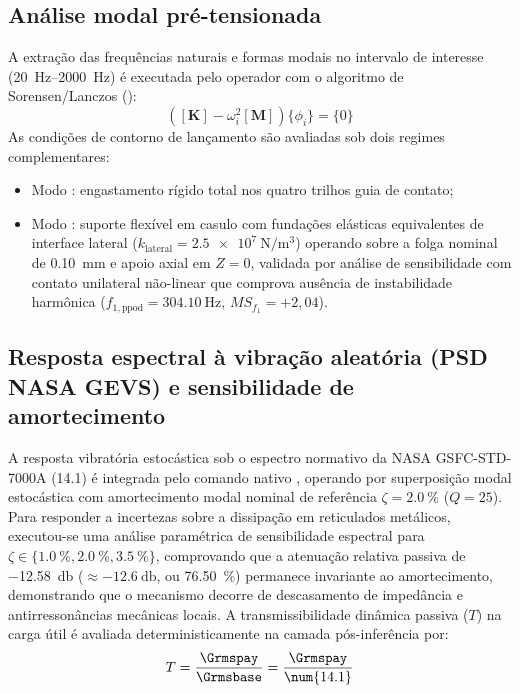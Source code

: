 \subsection{Análise modal pré-tensionada}
\label{subsec:metod-modal}
A extração das frequências naturais e formas modais no intervalo de interesse (\SIrange{20}{2000}{\hertz}) é executada pelo operador  com o algoritmo de Sorensen/Lanczos ():
\begin{equation}
  \left( [\mathbf{K}] - \omega_i^{2} [\mathbf{M}] \right) \{\phi_i\} = \{0\}
  \label{eq:autovalor-metod}
\end{equation}
As condições de contorno de lançamento são avaliadas sob dois regimes complementares:
\begin{itemize}
  \item Modo : engastamento rígido total nos quatro trilhos guia de contato;
  \item Modo : suporte flexível em casulo com fundações elásticas equivalentes de interface lateral ($k_{\text{lateral}} = \SI{2.5e7}{\newton\per\cubic\metre}$) operando sobre a folga nominal de \SI{0.10}{\milli\metre} e apoio axial em $Z = 0$, validada por análise de sensibilidade com contato unilateral não-linear que comprova ausência de instabilidade harmônica ($f_{1,\text{ppod}} = \SI{304.10}{\hertz}$, $MS_{f_1} = +2{,}04$).
\end{itemize}

\subsection{Resposta espectral à vibração aleatória (PSD NASA GEVS) e sensibilidade de amortecimento}
\label{subsec:metod-psd}
A resposta vibratória estocástica sob o espectro normativo da NASA GSFC-STD-7000A (\SI{14.1}{\Grms}) é integrada pelo comando nativo , operando por superposição modal estocástica com amortecimento modal nominal de referência $\zeta = \SI{2.0}{\percent}$ ($Q = 25$). Para responder a incertezas sobre a dissipação em reticulados metálicos, executou-se uma análise paramétrica de sensibilidade espectral para $\zeta \in \{\SI{1.0}{\percent}, \SI{2.0}{\percent}, \SI{3.5}{\percent}\}$, comprovando que a atenuação relativa passiva de \SI{-12.58}{\decibel} ($\approx \SI{-12.6}{\decibel}$, ou \SI{76.50}{\percent}) permanece invariante ao amortecimento, demonstrando que o mecanismo decorre de descasamento de impedância e antirressonâncias mecânicas locais. A transmissibilidade dinâmica passiva ($T$) na carga útil é avaliada deterministicamente na camada pós-inferência por:
\begin{equation}
  T = \frac{\Grmspay}{\Grmsbase} = \frac{\Grmspay}{\num{14.1}}
  \label{eq:transmissibilidade-metod}
\end{equation}

